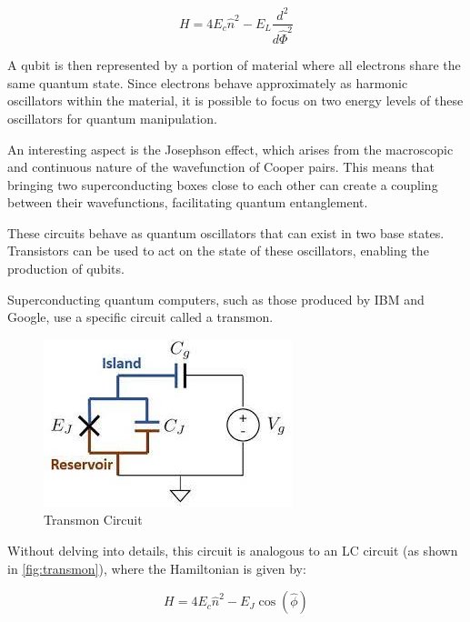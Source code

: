 \documentclass{article}
\begin{document}
\begin{multicols}{2}
\begin{equation}
H = 4E_c\hat{n}^2 - E_L\frac{d^2}{d\hat{\Phi}^2}
\end{equation}

A qubit is then represented by a portion of material where all electrons share the same quantum state. 
Since electrons behave approximately as harmonic oscillators within the material, it is possible to focus on two energy levels of these oscillators for quantum manipulation.

An interesting aspect is the Josephson effect, which arises from the macroscopic and continuous nature of the wavefunction of Cooper pairs. 
This means that bringing two superconducting boxes close to each other can create a coupling between their wavefunctions, facilitating quantum entanglement.

These circuits behave as quantum oscillators that can exist in two base states. Transistors can be used to act on the state of these oscillators, enabling the production of qubits.

Superconducting quantum computers, such as those produced by IBM and Google, use a specific circuit called a transmon.

\begin{figure}[H]
    \centering
    \includegraphics[width = \columnwidth]{fig/transmon_circuit.jpg}
    \caption{Transmon Circuit}
    \label{fig:transmon}
\end{figure}

Without delving into details, this circuit is analogous to an LC circuit (as shown in \autoref{fig:transmon}), where the Hamiltonian is given by:

\begin{equation}
H = 4E_c\hat{n}^2 - E_J\cos(\hat{\phi})
\end{equation}


\end{multicols}
\end{document}
